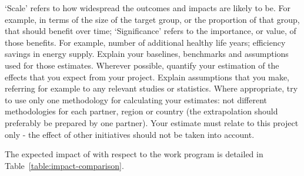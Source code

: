 {	‘Scale’ refers to how widespread the outcomes and impacts are likely to be. For example, in terms of the size of the target group, or the proportion of that group, that should benefit over time; ‘Significance’ refers to the importance, or value, of those benefits. For example, number of additional healthy life years; efficiency savings in energy supply.
	Explain your baselines, benchmarks and assumptions used for those estimates. Wherever possible, quantify your estimation of the effects that you expect from your project. Explain assumptions that you make, referring for example to any relevant studies or statistics. Where appropriate, try to use only one methodology for calculating your estimates: not different methodologies for each partner, region or country (the extrapolation should preferably be prepared by one partner).
	Your estimate must relate to this project only - the effect of other initiatives should not be taken into account.
}


The expected impact of \TheProject with respect to the
work program is detailed in Table~\ref{table:impact-comparison}.

